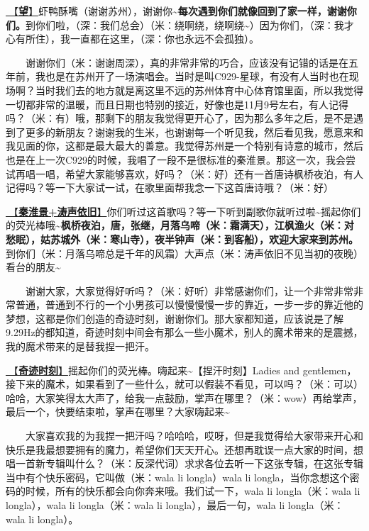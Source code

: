 \documentclass[]{ctexbook}
\begin{document}
\hyperref[hope]{🎵【\textbf{望}】}虾鸭酥嘴（谢谢苏州），谢谢你\textasciitilde{}\textbf{每次遇到你们就像回到了家一样，谢谢你们。}到你们啦，（深：我们总会）（米：绕啊绕，绕啊绕\textasciitilde）因为你们，（深：我才心有所住），我一直都在这里，（深：你也永远不会孤独）。

  谢谢你们（米：谢谢周深），真的非常非常的巧合，应该没有记错的话是在五年前，我也是在苏州开了一场演唱会。当时是叫C929-星球，有没有人当时也在现场啊？当时我们去的地方就是离这里不远的苏州体育中心体育馆里面，所以我觉得一切都非常的温暖，而且日期也特别的接近，好像也是11月9号左右，有人记得吗？（米：有）哦，那剩下的朋友我觉得更开心了，因为那么多年之后，是不是遇到了更多的新朋友？谢谢我的生米，也谢谢每一个听见我，然后看见我，愿意来和我见面的你，这都是最大最大的善意。我觉得苏州是一个特别有诗意的城市，然后也是在上一次C929的时候，我唱了一段不是很标准的秦淮景。那这一次，我会尝试再唱一唱，希望大家能够喜欢，好吗？（米：好）还有一首唐诗枫桥夜泊，有人记得吗？等一下大家试一试，在歌里面帮我念一下这首唐诗哦？（米：好）

\hyperref[taoshengyijiu]{🎵【\textbf{秦淮景+涛声依旧}】}你们听过这首歌吗？等一下听到副歌你就听过啦\textasciitilde 摇起你们的荧光棒哦\textasciitilde{}\textbf{枫桥夜泊，唐，张继，月落乌啼（米：霜满天），江枫渔火（米：对愁眠），姑苏城外（米：寒山寺），夜半钟声（米：到客船），欢迎大家来到苏州。}到你们（米：月落乌啼总是千年的风霜）大声点（米：涛声依旧不见当初的夜晚）看台的朋友\textasciitilde{}

  谢谢大家，大家觉得好听吗？（米：好听）非常感谢你们，让一个非常非常非常普通，普通到不行的一个小男孩可以慢慢慢慢一步的靠近，一步一步的靠近他的梦想，这都是你们创造的奇迹时刻，谢谢你们。那大家都知道，应该说是了解9.29Hz的都知道，奇迹时刻中间会有那么一些小魔术，别人的魔术带来的是震撼，我的魔术带来的是替我捏一把汗。

\hyperref[magic-moment]{🎵【\textbf{奇迹时刻}】}摇起你们的荧光棒。嗨起来\textasciitilde【捏汗时刻】Ladies and gentlemen，接下来的魔术，如果看到了一些什么，就可以假装不看见，可以吗？（米：可以）哈哈，大家笑得太大声了，给我一点鼓励，掌声在哪里？（米：wow）再给掌声，最后一个，快要结束啦，掌声在哪里？大家嗨起来\textasciitilde{}

  大家喜欢我的为我捏一把汗吗？哈哈哈，哎呀，但是我觉得给大家带来开心和快乐是我最想要拥有的魔力，希望你们天天开心。还想再耽误一点大家的时间，想唱一首新专辑叫什么？（米：反深代词）求求各位去听一下这张专辑，在这张专辑当中有个快乐密码，它叫做（米：wala li longla）wala li longla，当你念想这个密码的时候，所有的快乐都会向你奔来哦。我们试一下，wala li longla（米：wala li longla），wala li longla（米：wala li longla），最后一句，wala li longla（米：wala li longla）。
\end{document}
